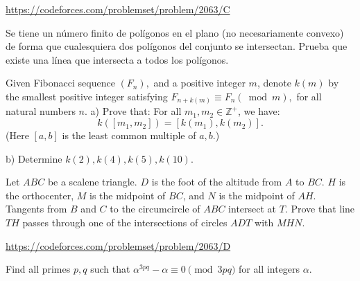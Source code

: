 \documentclass[11pt]{scrartcl}
\begin{document}
\begin{problem}[CF 2063C]
\url{https://codeforces.com/problemset/problem/2063/C}
\end{problem}
\begin{problem}
Se tiene un número finito de polígonos en el plano (no necesariamente convexo) de forma que cualesquiera dos polígonos del conjunto se intersectan. Prueba que existe una línea que intersecta a todos los polígonos.
\end{problem}
\begin{problem}
Given Fibonacci sequence $(F_n),$ and a positive integer $m$, denote $k(m)$ by the smallest positive integer satisfying $F_{n+k(m)}\equiv F_n(\bmod m),$ for all natural numbers $n$.
a) Prove that: For all $m_1,m_2\in \mathbb{Z^+}$, we have:$$k([m_1,m_2])=[k(m_1),k(m_2)].$$(Here $[a,b]$ is the least common multiple of $a,b.$)

b) Determine $k(2),k(4),k(5),k(10).$
\end{problem}
\begin{problem}[GMO 2024/3]
	Let $ABC$ be a scalene triangle. $D$ is the foot of the altitude from $A$ to $BC$. $H$ is the orthocenter, $M$ is the midpoint of $BC$, and $N$ is the midpoint of $AH$. Tangents from $B$ and $C$ to the circumcircle of $ABC$ intersect at $T$. Prove that line $TH$ passes through one of the intersections of circles $ADT$ with $MHN$.
\end{problem}
\begin{problem}[CF 2063D]
\url{https://codeforces.com/problemset/problem/2063/D}
\end{problem}
\begin{problem}
Find all primes $ p,q $ such that $ \alpha^{3pq} -\alpha \equiv 0 \pmod {3pq} $ for all integers $ \alpha $.
\end{problem}
\end{document}
